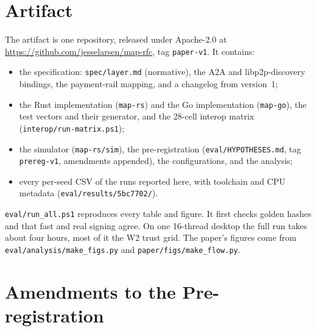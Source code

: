 \section{Artifact}
\label{app:artifact}

The artifact is one repository, released under Apache-2.0 at
\url{https://github.com/jesselarsen/map-rfc}, tag \texttt{paper-v1}. It
contains:
\begin{itemize}
\item the specification: \texttt{spec/layer.md} (normative), the A2A and
  libp2p-discovery bindings, the payment-rail mapping, and a changelog
  from version~1;
\item the Rust implementation (\texttt{map-rs}) and the Go implementation
  (\texttt{map-go}), the test vectors and their generator, and the
  28-cell interop matrix (\texttt{interop/run-matrix.ps1});
\item the simulator (\texttt{map-rs/sim}), the pre-registration
  (\texttt{eval/HYPOTHESES.md}, tag \texttt{prereg-v1}, amendments
  appended), the configurations, and the analysis;
\item every per-seed CSV of the runs reported here, with toolchain and
  CPU metadata (\texttt{eval/results/5bc7702/}).
\end{itemize}
\texttt{eval/run\_all.ps1} reproduces every table and figure. It first
checks golden hashes and that fast and real signing agree. On one 16-thread
desktop the full run takes about four hours, most of it the W2 trust grid.
The paper's figures come from \texttt{eval/analysis/make\_figs.py} and
\texttt{paper/figs/make\_flow.py}.

\section{Amendments to the Pre-registration}
\label{app:amendments}

